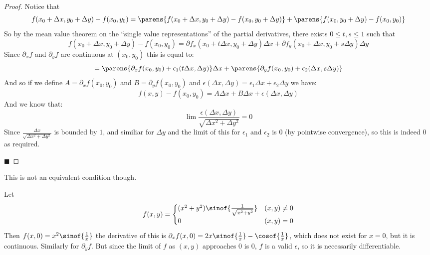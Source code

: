 \documentclass[10pt]{article}
\begin{document}
\begin{proof}

    Notice that
    \[ f(x_0+\Delta x, y_0+\Delta y) - f(x_0,y_0) = \parens{f(x_0+\Delta x, y_0+\Delta y)-f(x_0,y_0+\Delta y)} + \parens{f(x_0,y_0+\Delta y) - f(x_0,y_0)} \]
    So by the mean value theorem on the ``single value representations'' of the partial derivatives, there exists $0\leq t,s\leq1$ such that
    \[ f(x_0+\Delta x,y_0+\Delta y) - f(x_0,y_0) = \partial f_x(x_0+t\Delta x,y_0+\Delta y)\Delta x + \partial f_y(x_0+\Delta x,y_0+s\Delta y)\Delta y \]
    Since $\partial_x f$ and $\partial_y f$ are continuous at $(x_0,y_0)$ this is equal to:
    \[ = \parens{\partial_x f(x_0,y_0) + \epsilon_1(t\Delta x,\Delta y)}\Delta x + \parens{\partial_y f(x_0,y_0) + \epsilon_2(\Delta x,s\Delta y)} \]
    And so if we define $A=\partial_x f(x_0,y_0)$ and $B=\partial_y f(x_0,y_0)$ and $\epsilon(\Delta x,\Delta y)=\epsilon_1\Delta x+\epsilon_2\Delta y$ we have:
    \[ f(x,y) - f(x_0,y_0) = A\Delta x + B\Delta x + \epsilon(\Delta x,\Delta y) \]
    And we know that:
    \[ \lim\frac{\epsilon(\Delta x,\Delta y)}{\sqrt{\Delta x^2+\Delta y^2}} = 0 \]
    Since $\frac{\Delta x}{\sqrt{\Delta x^2+\Delta y^2}}$ is bounded by $1$, and similiar for $\Delta y$ and the limit of this for $\epsilon_1$ and $\epsilon_2$ is $0$ (by pointwise convergence), so this
    is indeed $0$ as required.

    \hfill$\blacksquare$

\end{proof}

This is not an equivalent condition though.

\begin{exam}

    Let
    \[ f(x,y) = \begin{cases} (x^2+y^2)\sinof{\frac1{\sqrt{x^2+y^2}}} & (x,y)\neq0 \\ 0 & (x,y)=0 \end{cases} \]
    Then $f(x,0) = x^2\sinof{\frac1{x}}$ the derivative of this is $\partial_x f(x,0)=2x\sinof{\frac1x}-\cosof{\frac1x}$, which does not exist for $x=0$, but it is continuous.
    Similarly for $\partial_y f$.
    But since the limit of $f$ as $(x,y)$ approaches $0$ is $0$, $f$ is a valid $\epsilon$, so it is necessarily differentiable.

\end{exam}
\end{document}
